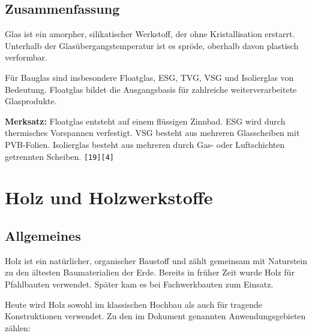 \documentclass[
  12pt,
  a4paper,
  oneside
]{scrreprt}
\newcommand{\quelle}[1]{\hfill\texttt{#1}}
\begin{document}
\section{Zusammenfassung}

Glas ist ein amorpher, silikatischer Werkstoff, der ohne
Kristallisation erstarrt. Unterhalb der Glasübergangstemperatur ist es
spröde, oberhalb davon plastisch verformbar. 

Für Bauglas sind insbesondere Floatglas, ESG, TVG, VSG und Isolierglas
von Bedeutung. Floatglas bildet die Ausgangsbasis für zahlreiche
weiterverarbeitete Glasprodukte. 

\begin{merksatzbox}
\textbf{Merksatz:}
Floatglas entsteht auf einem flüssigen Zinnbad. ESG wird durch
thermisches Vorspannen verfestigt. VSG besteht aus mehreren
Glasscheiben mit PVB-Folien. Isolierglas besteht aus mehreren durch
Gas- oder Luftschichten getrennten Scheiben.
\quelle{[19][4]}
\end{merksatzbox}



\chapter{Holz und Holzwerkstoffe}

\section{Allgemeines}

Holz ist ein natürlicher, organischer Baustoff und zählt gemeinsam mit
Naturstein zu den ältesten Baumaterialien der Erde. Bereits in früher
Zeit wurde Holz für Pfahlbauten verwendet. Später kam es bei
Fachwerkbauten zum Einsatz. 

Heute wird Holz sowohl im klassischen Hochbau als auch für tragende
Konstruktionen verwendet. Zu den im Dokument genannten
Anwendungsgebieten zählen:
\end{document}
